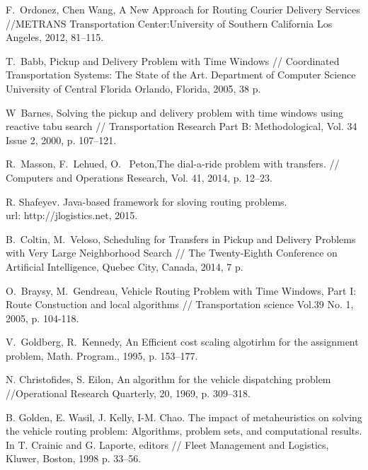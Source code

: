 \documentclass[]{TAACpaper}
\begin{document}
\begin{thebibliography}{99}

 F.~Ordonez, Chen Wang, A New Approach for Routing Courier Delivery Services //METRANS Transportation Center:University of Southern California
Los Angeles,  2012, 81--115.

 T.~Babb, Pickup and Delivery Problem with Time Windows // Coordinated Transportation Systems: The State of the Art. Department of Computer Science University of Central Florida Orlando, Florida, 2005, 38 p.

 W~Barnes, Solving the pickup and delivery problem with time windows using reactive tabu search // Transportation Research Part B: Methodological, Vol. 34 Issue 2, 2000, p. 107--121.

 R.~Masson, F.~Lehued, O.~ Peton,The dial-a-ride problem with transfers. // Computers and Operations Research, Vol. 41, 2014, p. 12--23.

  R. Shafeyev. Java-based framework for sloving routing problems.\\ url: http://jlogistics.net, 2015.

 B.~Coltin, M.~Veloso, Scheduling for Transfers in Pickup and Delivery Problems with Very Large Neighborhood Search // The Twenty-Eighth Conference on Artificial Intelligence, Quebec City, Canada, 2014, 7 p.

 O.~Braysy, M.~Gendreau, Vehicle Routing Problem with Time Windows, Part I: Route Constuction and local algorithms // Transportation science Vol.39 No. 1, 2005, p. 104-118.

 V.~Goldberg, R.~Kennedy, An Efficient cost scaling algotirhm for the assignment problem, Math. Program., 1995, p. 153--177.  

  N. Christofides, S. Eilon, An algorithm for the vehicle dispatching problem //Operational Research Quarterly, 20, 1969, p. 309–318.

  B. Golden, E. Wasil, J. Kelly, I-M. Chao. The impact of metaheuristics on solving the vehicle routing problem: Algorithms, problem sets, and computational results. In T. Crainic and G. Laporte, editors // Fleet Management and Logistics, Kluwer, Boston, 1998 p. 33–56.


\end{thebibliography}
\end{document}
